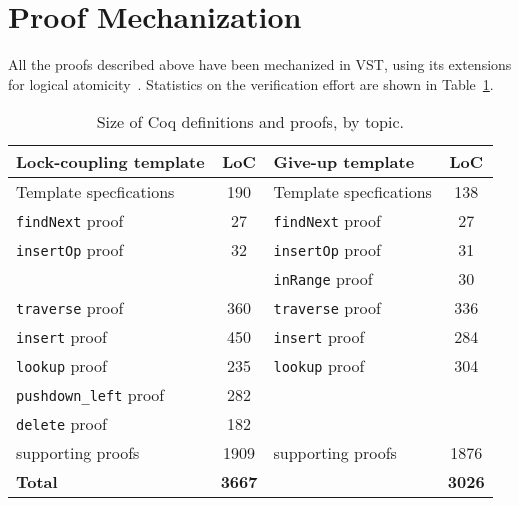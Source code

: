 \documentclass[a4paper,UKenglish,cleveref, autoref, thm-restate]{lipics-v2021}
\newcommand{\wm}[1]{\textbf{\textcolor{violet}{[William: #1]}}}
\begin{document}
\section{Proof Mechanization}
\label{proof_mech}
All the proofs described above have been mechanized in VST, using its extensions for logical atomicity~\cite{iris-vst-arxiv}. Statistics on the verification effort are shown in Table~\ref{table_coq}.

\begin{table}[h]
	\begin{center}
		\begin{tabular}{l | c || l | c } 
			\hline
			\textbf{Lock-coupling template} & \textbf{LoC} & \textbf{Give-up  template} & \textbf{LoC} \\
			\hline
			Template specfications & 190 & Template specfications & 138 \\
			\texttt{findNext} proof 	& 27  & \texttt{findNext} proof & 27 \\
			\texttt{insertOp} proof 	& 32  & \texttt{insertOp} proof & 31 \\
			& & \texttt{inRange} proof & 30 \\
			\texttt{traverse} proof	& 360  & \texttt{traverse} proof & 336 \\ 
			\texttt{insert} proof 	   		& 450  & \texttt{insert} proof & 284 \\
			\texttt{lookup} proof 	   	& 235  &  \texttt{lookup} proof & 304 \\ 
			\texttt{pushdown\_left} proof 	   	& 282 & & \\	
			\texttt{delete} proof 		& 182	 &   & 	 \\
			supporting proofs    & 	1909	 & supporting proofs 	& 1876 \\
			\hline
			\textbf{Total} & \textbf{3667} & & \textbf{3026}  
		\end{tabular}
		\caption{Size of Coq definitions and proofs, by topic.}
		\label{table_coq}
	\end{center}
\end{table}

\end{document}
